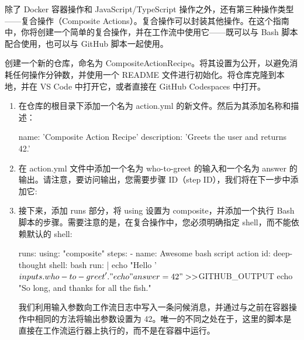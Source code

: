
除了 Docker 容器操作和 JavaScript/TypeScript 操作之外，还有第三种操作类型——复合操作（Composite Actions）。复合操作可以封装其他操作。在这个指南中，你将创建一个简单的复合操作，并在工作流中使用它——既可以与 Bash 脚本配合使用，也可以与 GitHub 脚本一起使用。


创建一个新的仓库，命名为 CompositeActionRecipe。将其设置为公开，以避免消耗任何操作分钟数，并使用一个 README 文件进行初始化。将仓库克隆到本地，并在 VS Code 中打开它，或者直接在 GitHub Codespaces 中打开。


\begin{enumerate}
\item 
在仓库的根目录下添加一个名为 action.yml 的新文件。然后为其添加名称和描述：

\begin{shell}
name: 'Composite Action Recipe'
description: 'Greets the user and returns 42.'
\end{shell}

\item 
在 action.yml 文件中添加一个名为 who-to-greet 的输入和一个名为 answer 的输出。请注意，要访问输出，您需要步骤 ID（step ID），我们将在下一步中添加它:


\item 
接下来，添加 runs 部分，将 using 设置为 composite，并添加一个执行 Bash 脚本的步骤。需要注意的是，在复合操作中，您必须明确指定 shell，而不能依赖默认的 shell:

\begin{shell}
runs:
  using: "composite"
  steps:
    - name: Awesome bash script action
      id: deep-thought
      shell: bash
      run: |
        echo "Hello '${{ inputs.who-to-greet }}'."
        echo "answer=42" >> $GITHUB_OUTPUT
        echo "So long, and thanks for all the fish."
\end{shell}

我们利用输入参数向工作流日志中写入一条问候消息，并通过与之前在容器操作中相同的方法将输出参数设置为 42。唯一的不同之处在于，这里的脚本是直接在工作流运行器上执行的，而不是在容器中运行。


\end{enumerate}
